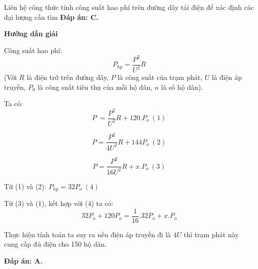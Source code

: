 \begin{dang}{Liên hệ công thức tính công suất hao phí trên đường dây tải điện để xác định các đại lượng cần tìm}
{		\textbf{Đáp án: C.}
	}
	{\begin{center}
			\textbf{Hướng dẫn giải}
		\end{center}
		
		Công suất hao phí:
		$$ P_{hp}=\frac{P^2}{U^2}R$$ 
		(Với $R$ là điện trở trên đường dây, $P$ là công suất của trạm phát, $U$ là điện áp truyền, $P_0$ là công suất tiêu thụ của mỗi hộ dân, $n$ là số hộ dân).
		
		Ta có:
		$$P\ =\frac{P^2}{U^2}R+120.P_o\ \left(1\right)$$
		
		$$P=\frac{P^2}{4U^2}R+144P_o\ \left(2\right)$$
		
		$$P=\frac{P^2}{16U^2}R+x.P_o\ (3)$$
		
		Từ (1)  và (2): $P_{hp} = 32P_o\ (4)$
		
		Từ (3) và (1), kết hợp với (4) ta có: $$32P_o+120P_o=\frac{1}{16}{.32P}_o+x.P_o$$
		
		Thực hiện tính toán ta suy ra nếu điện áp truyền đi là $4U$ thì trạm phát này cung cấp đủ điện cho 150 hộ dân.
		
		\textbf{Đáp án: A.}
	}
	
	
	
	
\end{dang}
